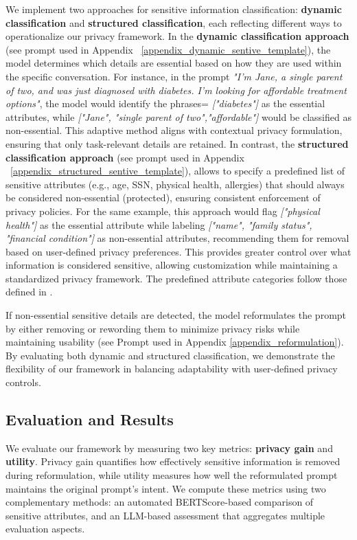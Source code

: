 We implement two approaches for sensitive information classification: \textbf{dynamic classification}  and \textbf{structured classification}, each reflecting different ways to operationalize our privacy framework. In the \textbf{dynamic classification approach} (see prompt used in Appendix ~\ref{appendix_dynamic_sentive_template}),  the model determines which details are essential based on how they are used within the specific conversation. For instance, in the prompt \emph{"I’m Jane, a single parent of two, and was just diagnosed with diabetes. I’m looking for affordable treatment options"}, the model would identify the phrases= \emph{["diabetes"]} as the essential attributes, while \emph{["Jane", "single parent of two","affordable"]} would be classified as non-essential. This adaptive method aligns with contextual privacy formulation, ensuring that only task-relevant details are retained. In contrast, the \textbf{structured classification approach} (see prompt used in Appendix ~\ref{appendix_structured_sentive_template}), allows to specify a predefined list of sensitive attributes (e.g., age, SSN, physical health, allergies) that should always be considered non-essential (protected), ensuring consistent enforcement of privacy policies.  For the same example, this approach would flag \emph{["physical health"]} as the essential attribute while labeling \emph{["name", "family status", "financial condition"]} as non-essential attributes, recommending them for removal based on user-defined privacy preferences. This provides greater control over what information is considered sensitive, allowing customization while maintaining a standardized privacy framework. The predefined attribute categories follow those defined in \citet{bagdasaryan2024air}.

If non-essential sensitive details are detected, the model reformulates the prompt by either removing or rewording them to minimize privacy risks while maintaining usability (see Prompt used in Appendix \ref{appendix_reformulation}). By evaluating both dynamic and structured classification, we demonstrate the flexibility of our framework in balancing adaptability with user-defined privacy controls.

\subsection{Evaluation and Results}

We evaluate our framework by measuring two key metrics: \textbf{privacy gain} and \textbf{utility}. Privacy gain quantifies how effectively sensitive information is removed during reformulation, while utility measures how well the reformulated prompt maintains the original prompt's intent. We compute these metrics using two complementary methods: an automated BERTScore-based comparison of sensitive attributes, and an LLM-based assessment that aggregates multiple evaluation aspects.

